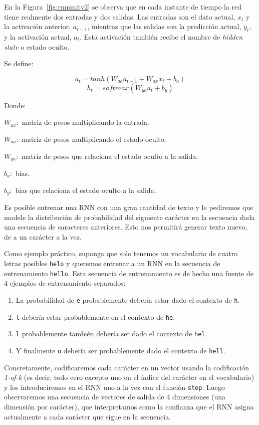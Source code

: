 \documentclass[a4paper,12pt]{article}
\begin{document}
En la Figura~\ref{fig:rnnunitv2} se observa que en cada instante de tiempo la red tiene realmente dos entradas y dos salidas. Las entradas son el dato actual, $x_t$ y la activación anterior, $a_{t-1}$, mientras que las salidas son la predicción actual, $y_t$, y la activación actual, $a_t$. Esta activación también recibe el nombre de \textit{hidden state} o estado oculto.

Se define:

$$ a_{t} = tanh(W_{aa}a_{t-1}+W_{ax}x_t+b_a) $$
$$ h_t = softmax(W_{ya}a_t + b_y) $$

Donde:

$ W_{ax}:$ matriz de pesos multiplicando la entrada.

$ W_{aa}:$ matriz de pesos multiplicando el estado oculto.

$ W_{ya}:$ matriz de pesos que relaciona el estado oculto a la salida.

$b_a:$ bias.

$b_y:$ bias que relaciona el estado oculto a la salida.

Es posible entrenar una RNN con una gran cantidad de texto y le pediremos que modele la distribución de probabilidad del siguiente carácter en la secuencia dada una secuencia de caracteres anteriores. Esto nos permitirá generar texto nuevo, de a un carácter a la vez.

Como ejemplo práctico, suponga que solo tenemos un vocabulario de cuatro letras posibles \texttt{helo} y queremos entrenar a un RNN en la secuencia de entrenamiento \texttt{hello}. Esta secuencia de entrenamiento es de hecho una fuente de 4 ejemplos de entrenamiento separados: 
\begin{enumerate}
	\item La probabilidad de \texttt{e} probablemente debería estar dado el contexto de \texttt{h}.
	\item \texttt{l} debería estar probablemente en el contexto de \texttt{he}.
	\item \texttt{l} probablemente también debería ser dado el contexto de \texttt{hel}.
	\item  Y finalmente \texttt{o} debería ser probablemente dado el contexto de \texttt{hell}.
\end{enumerate}

Concretamente, codificaremos cada carácter en un vector usando la codificación \textit{1-of-k} (es decir, todo cero excepto uno en el índice del carácter en el vocabulario) y los introduciremos en el RNN uno a la vez con el función \texttt{step}. Luego observaremos una secuencia de vectores de salida de 4 dimensiones (una dimensión por carácter), que interpretamos como la confianza que el RNN asigna actualmente a cada carácter que sigue en la secuencia. 
\end{document}
